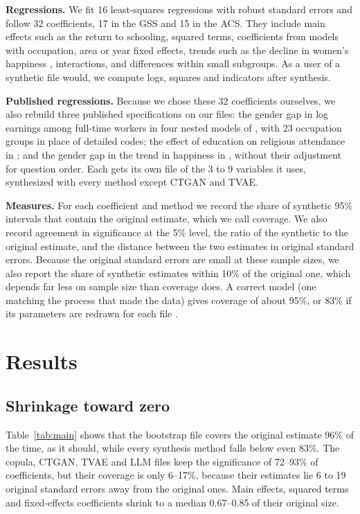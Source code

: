 \documentclass[10pt]{article}
\begin{document}
\textbf{Regressions.} We fit 16 least-squares regressions with robust standard errors and follow 32
coefficients, 17 in the GSS and 15 in the ACS. They include main effects such as the return to
schooling, squared terms, coefficients from models with occupation, area or year fixed effects, trends
such as the decline in women's happiness \citep{stevenson2009}, interactions, and differences within
small subgroups. As a user of a synthetic file would, we compute logs, squares and indicators after
synthesis.

\textbf{Published regressions.} Because we chose these 32 coefficients ourselves, we also rebuild three
published specifications on our files: the gender gap in log earnings among full-time workers in four
nested models of \citet[Table 1]{goldin2014}, with 23 occupation groups in place of detailed codes; the
effect of education on religious attendance in \citet[Table I]{glaeser2008}; and the gender gap in the
trend in happiness in \citet[Table 1]{stevenson2009}, without their adjustment for question order. Each gets
its own file of the 3 to 9 variables it uses, synthesized with every method except CTGAN and TVAE.

\textbf{Measures.} For each coefficient and method we record the share of synthetic 95\%
intervals that contain the original estimate, which we call coverage. We also record agreement in
significance at the 5\% level, the ratio of the synthetic to the original estimate, and the distance
between the two estimates in original standard errors. Because the original standard errors are small at
these sample sizes, we also report the share of synthetic estimates within 10\% of the original one,
which depends far less on sample size than coverage does. A correct model (one matching the process that made the data) gives coverage of about 95\%, or
83\% if its parameters are redrawn for each file \citep{raab2016}.

\section{Results}
\subsection{Shrinkage toward zero}
Table~\ref{tab:main} shows that the bootstrap file covers the original estimate 96\% of the time, as it
should, while every synthesis method falls below even 83\%. The copula,
CTGAN, TVAE and LLM files keep the significance of 72--93\% of coefficients, but their coverage is only
6--17\%, because their estimates lie 6 to 19 original standard errors away from the original ones. Main
effects, squared terms and fixed-effects coefficients shrink to a median 0.67--0.85 of their original size.
\end{document}
